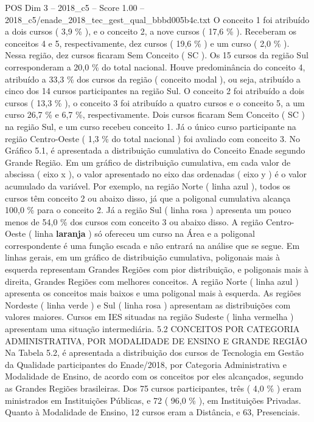 \begin{textsample}{POS Dim 3 – 2018\_c5 – Score 1.00 – 2018\_c5/enade\_2018\_tec\_gest\_qual\_bbbd005b4c.txt}
O conceito 1 foi atribuído a dois cursos ( 3,9 \% ), e o conceito 2, a nove cursos ( 17,6 \% ).
Receberam os conceitos 4 e 5, respectivamente, dez cursos ( 19,6 \% ) e um curso ( 2,0 \% ).
Nessa região, dez cursos ficaram Sem Conceito ( SC ).
Os 15 cursos da região Sul corresponderam a 20,0 \% do total nacional.
Houve predominância do conceito 4, atribuído a 33,3 \% dos cursos da região ( conceito modal ), ou seja, atribuído a cinco dos 14 cursos participantes na região Sul.
O conceito 2 foi atribuído a dois cursos ( 13,3 \% ), o conceito 3 foi atribuído a quatro cursos e o conceito 5, a um curso 26,7 \% e 6,7 \%, respectivamente.
Dois cursos ficaram Sem Conceito ( SC ) na região Sul, e um curso recebeu conceito 1.
Já o único curso participante na região Centro-Oeste ( 1,3 \% do total nacional ) foi avaliado com conceito 3.
No Gráfico 5.1, é apresentada a distribuição cumulativa do Conceito Enade segundo Grande Região.
Em um gráfico de distribuição cumulativa, em cada valor de abscissa ( eixo x ), o valor apresentado no eixo das ordenadas ( eixo y ) é o valor acumulado da variável.
Por exemplo, na região Norte ( linha azul ), todos os cursos têm conceito 2 ou abaixo disso, já que a poligonal cumulativa alcança 100,0 \% para o conceito 2.
Já a região Sul ( linha rosa ) apresenta um pouco menos de 54,0 \% dos cursos com conceito 3 ou abaixo disso.
A região Centro-Oeste ( linha \textbf{laranja} ) só ofereceu um curso na Área e a poligonal correspondente é uma função escada e não entrará na análise que se segue.
Em linhas gerais, em um gráfico de distribuição cumulativa, poligonais mais à esquerda representam Grandes Regiões com pior distribuição, e poligonais mais à direita, Grandes Regiões com melhores conceitos.
A região Norte ( linha azul ) apresenta os conceitos mais baixos e uma poligonal mais à esquerda.
As regiões Nordeste ( linha verde ) e Sul ( linha rosa ) apresentam as distribuições com valores maiores.
Cursos em IES situadas na região Sudeste ( linha vermelha ) apresentam uma situação intermediária. 5.2 CONCEITOS POR CATEGORIA ADMINISTRATIVA, POR MODALIDADE DE ENSINO E GRANDE REGIÃO Na Tabela 5.2, é apresentada a distribuição dos cursos de Tecnologia em Gestão da Qualidade participantes do Enade/2018, por Categoria Administrativa e Modalidade de Ensino, de acordo com os conceitos por eles alcançados, segundo as Grandes Regiões brasileiras.
Dos 75 cursos participantes, três ( 4,0 \% ) eram ministrados em Instituições Públicas, e 72 ( 96,0 \% ), em Instituições Privadas.
Quanto à Modalidade de Ensino, 12 cursos eram a Distância, e 63, Presenciais.

\end{textsample}
